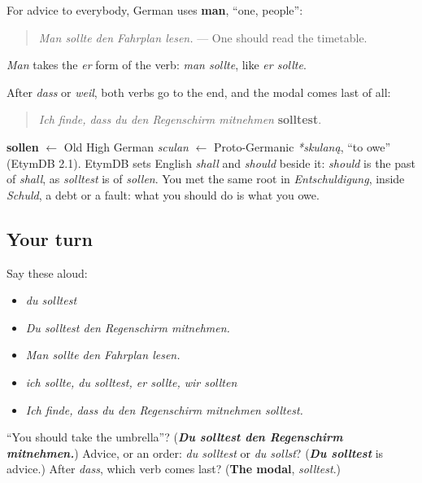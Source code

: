 \begin{grammarlens}[title={Grammar Lens: man sollte, and two verbs at the end}]
For advice to everybody, German uses \textbf{man}, \textquotedblleft{}one, people\textquotedblright{}:

\begin{quote}
\emph{Man sollte den Fahrplan lesen.} — One should read the timetable.
\end{quote}

\emph{Man} takes the \emph{er} form of the verb: \emph{man sollte}, like \emph{er sollte}.

After \emph{dass} or \emph{weil}, both verbs go to the end, and the modal comes last of all:

\begin{quote}
\emph{Ich finde, dass du den Regenschirm mitnehmen} \textbf{solltest}.
\end{quote}
\end{grammarlens}

\begin{cousinweb}
\textbf{sollen} $\leftarrow$ Old High German \emph{sculan} $\leftarrow$ Proto-Germanic \emph{*skulaną}, \textquotedblleft{}to owe\textquotedblright{} (EtymDB 2.1). EtymDB sets English \emph{shall} and \emph{should} beside it: \emph{should} is the past of \emph{shall}, as \emph{solltest} is of \emph{sollen}. You met the same root in \emph{Entschuldigung}, inside \emph{Schuld}, a debt or a fault: what you should do is what you owe.
\end{cousinweb}

\subsection*{Your turn}
Say these aloud:

\begin{itemize}
\raggedright
  \item \emph{du solltest}
  \item \emph{Du solltest den Regenschirm mitnehmen.}
  \item \emph{Man sollte den Fahrplan lesen.}
  \item \emph{ich sollte, du solltest, er sollte, wir sollten}
  \item \emph{Ich finde, dass du den Regenschirm mitnehmen solltest.}
\end{itemize}

\begin{tcolorbox}[breakable,colback=teal!4,colframe=teal!35!black,title={Before you move on}]
\textquotedblleft{}You should take the umbrella\textquotedblright{}? (\emph{\textbf{Du solltest den Regenschirm mitnehmen.}}) Advice, or an order: \emph{du solltest} or \emph{du sollst}? (\emph{\textbf{Du solltest}} is advice.) After \emph{dass}, which verb comes last? (\textbf{The modal}, \emph{solltest}.)
\end{tcolorbox}
